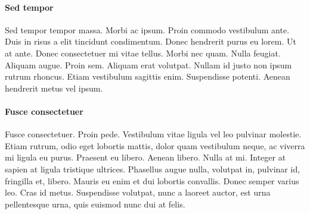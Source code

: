 \documentclass[a4paper, 11pt, draft]{article}
\begin{document}
\paragraph{Sed tempor}
Sed tempor tempor massa. Morbi ac ipsum. Proin commodo vestibulum ante. Duis in risus a elit tincidunt condimentum. Donec hendrerit purus eu lorem. Ut at ante. Donec consectetuer mi vitae tellus. Morbi nec quam. Nulla feugiat. Aliquam augue. Proin sem. Aliquam erat volutpat. Nullam id justo non ipsum rutrum rhoncus. Etiam vestibulum sagittis enim. Suspendisse potenti. Aenean hendrerit metus vel ipsum.

\paragraph{Fusce consectetuer}
Fusce consectetuer. Proin pede. Vestibulum vitae ligula vel leo pulvinar molestie. Etiam rutrum, odio eget lobortis mattis, dolor quam vestibulum neque, ac viverra mi ligula eu purus. Praesent eu libero. Aenean libero. Nulla at mi. Integer at sapien at ligula tristique ultrices. Phasellus augue nulla, volutpat in, pulvinar id, fringilla et, libero. Mauris eu enim et dui lobortis convallis. Donec semper varius leo. Cras id metus. Suspendisse volutpat, nunc a laoreet auctor, est urna pellentesque urna, quis euismod nunc dui at felis.
\end{document}
